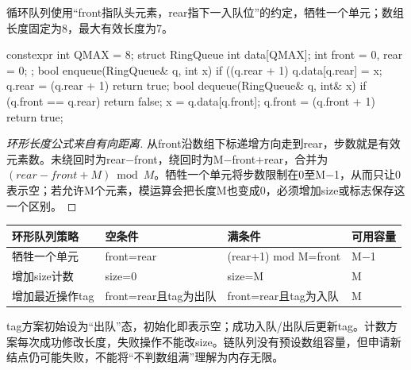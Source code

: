 循环队列使用``front指队头元素，rear指下一入队位''的约定，牺牲一个单元；数组长度固定为8，最大有效长度为7。

\begin{codeblock}[language=C++]
constexpr int QMAX = 8;
struct RingQueue { int data[QMAX]; int front = 0, rear = 0; };
bool enqueue(RingQueue& q, int x) {
    if ((q.rear + 1) %
    q.data[q.rear] = x;
    q.rear = (q.rear + 1) %
    return true;
}
bool dequeue(RingQueue& q, int& x) {
    if (q.front == q.rear) return false;
    x = q.data[q.front];
    q.front = (q.front + 1) %
    return true;
}
\end{codeblock}

\begin{proof}[环形长度公式来自有向距离]

从front沿数组下标递增方向走到rear，步数就是有效元素数。未绕回时为rear\ensuremath{-}front，绕回时为M\ensuremath{-}front+rear，合并为\((rear-front+M)\bmod M\)。牺牲一个单元将步数限制在0至M\ensuremath{-}1，从而只让0表示空；若允许M个元素，模运算会把长度M也变成0，必须增加size或标志保存这一个区别。

\end{proof}

\begin{wideblock}

\par\medskip\noindent\begin{minipage}{\linewidth}\fontsize{9.3}{12}\selectfont\begin{tabularx}{\linewidth}{@{}YYYY@{}}
\toprule\noalign{}
环形队列策略 & 空条件 & 满条件 & 可用容量 \\
\midrule\noalign{}


牺牲一个单元 & front=rear & (rear+1) mod M=front & M\ensuremath{-}1 \\
增加size计数 & size=0 & size=M & M \\
增加最近操作tag & front=rear且tag为出队 & front=rear且tag为入队 & M \\
\bottomrule\end{tabularx}
\end{minipage}\par\medskip

\end{wideblock}

tag方案初始设为``出队''态，初始化即表示空；成功入队/出队后更新tag。计数方案每次成功修改长度，失败操作不能改size。链队列没有预设数组容量，但申请新结点仍可能失败，不能将``不判数组满''理解为内存无限。

